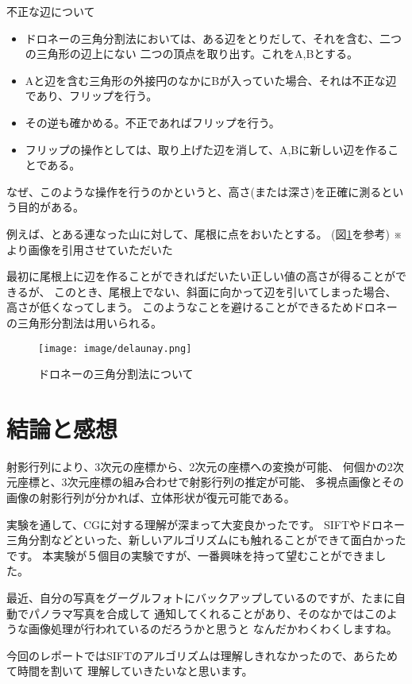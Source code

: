 \documentclass[11pt,a4j]{jsarticle}
\makeatletter
\newcommand{\figcaption}[1]{\def\@captype{figure}\caption{#1}}
\makeatother
\begin{document}
不正な辺について
\begin{itemize}
  \item ドロネーの三角分割法においては、ある辺をとりだして、それを含む、二つの三角形の辺上にない
  二つの頂点を取り出す。これをA,Bとする。
  \item Aと辺を含む三角形の外接円のなかにBが入っていた場合、それは不正な辺であり、フリップを行う。
  \item その逆も確かめる。不正であればフリップを行う。
  \item フリップの操作としては、取り上げた辺を消して、A,Bに新しい辺を作ることである。
\end{itemize}

なぜ、このような操作を行うのかというと、高さ(または深さ)を正確に測るという目的がある。

例えば、とある連なった山に対して、尾根に点をおいたとする。
(図\ref{fig:delaunay}を参考)
※\cite{kimura}より画像を引用させていただいた

最初に尾根上に辺を作ることができればだいたい正しい値の高さが得ることができるが、
このとき、尾根上でない、斜面に向かって辺を引いてしまった場合、高さが低くなってしまう。
このようなことを避けることができるためドロネーの三角形分割法は用いられる。

\begin{figure}[H]
  \centering
  \texttt{[image: image/delaunay.png]}
  \figcaption{ドロネーの三角分割法について}
  \label{fig:delaunay}
\end{figure}

\section{結論と感想}
\label{sec:結論と感想}
射影行列により、3次元の座標から、2次元の座標への変換が可能、
何個かの2次元座標と、3次元座標の組み合わせで射影行列の推定が可能、
多視点画像とその画像の射影行列が分かれば、立体形状が復元可能である。

実験を通して、CGに対する理解が深まって大変良かったです。
SIFTやドロネー三角分割などといった、新しいアルゴリズムにも触れることができて面白かったです。
本実験が５個目の実験ですが、一番興味を持って望むことができました。

最近、自分の写真をグーグルフォトにバックアップしているのですが、たまに自動でパノラマ写真を合成して
通知してくれることがあり、そのなかではこのような画像処理が行われているのだろうかと思うと
なんだかわくわくしますね。

今回のレポートではSIFTのアルゴリズムは理解しきれなかったので、あらためて時間を割いて
理解していきたいなと思います。
\end{document}
